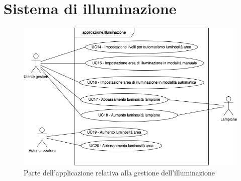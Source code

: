 \section{Sistema di illuminazione}

\begin{figure}[h]
    \includegraphics[width=\textwidth]{contenuti/img/casi_uso_grafici-applicazione,illuminazione.png}
    \caption{Parte dell'applicazione relativa alla gestione dell'illuminazione}
    \label{fig:illuminazione}
\end{figure}